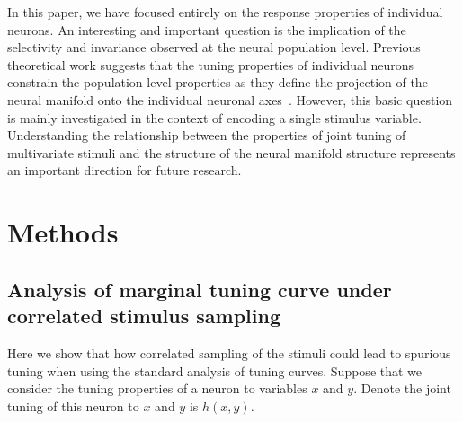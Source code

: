 \documentclass[11pt]{article}
\begin{document}

In this paper, we have focused entirely on the response properties of individual neurons. An interesting and important question is the implication of the selectivity and invariance observed at the neural population level. Previous theoretical work suggests that the tuning properties of individual neurons constrain the population-level properties as they define the projection of the neural manifold onto the individual neuronal axes~\cite{Kriegeskorte2021}. However, this basic question is mainly investigated in the context of encoding a single stimulus variable. Understanding the relationship between the properties of joint tuning of multivariate stimuli and the structure of the neural manifold structure represents an important direction for future research. 







\newpage

\section{Methods} 


\subsection{Analysis of marginal tuning curve under correlated stimulus sampling}
Here we show that how correlated sampling of the stimuli could lead to spurious tuning when using the standard analysis of tuning curves. Suppose that we consider the tuning properties of a neuron to variables $x$ and $y$. Denote the joint tuning of this neuron to $x$ and $y$ is $h(x,y)$.
\end{document}
